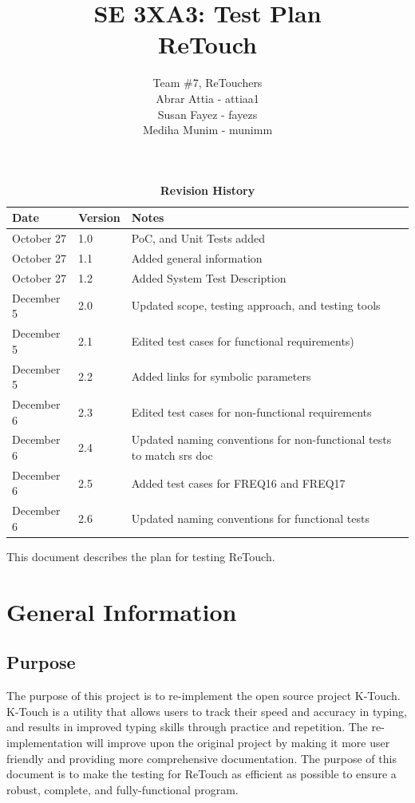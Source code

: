 \documentclass[12pt, titlepage]{article}
\title{SE 3XA3: Test Plan\\ReTouch}
\author{Team \#7, ReTouchers
		\\ Abrar Attia - attiaa1
		\\ Susan Fayez - fayezs
		\\ Mediha Munim - munimm
}
\begin{document}
\maketitle

\tableofcontents
\listoftables
\listoffigures

\begin{table}[htp]
\caption{\bf Revision History}
\begin{tabularx}{\textwidth}{p{3cm}p{2cm}X}
\toprule {\bf Date} & {\bf Version} & {\bf Notes}\\
\midrule
October 27 & 1.0 & PoC, and Unit Tests added\\
October 27 & 1.1 & Added general information\\
October 27 & 1.2 & Added System Test Description\\
December 5 & 2.0 & Updated scope, testing approach, and testing tools\\
December 5 & 2.1 & Edited test cases for functional  requirements)\\
December 5 & 2.2 & Added links for symbolic parameters\\
December 6 & 2.3 & Edited test cases for non-functional requirements\\
December 6 & 2.4 & Updated naming conventions for non-functional tests to match srs doc\\
December 6 & 2.5 & Added test cases for FREQ16 and FREQ17\\
December 6 & 2.6 & Updated naming conventions for functional tests\\

\bottomrule
\end{tabularx}
\end{table}
\newpage


This document describes the plan for testing ReTouch.

\section{General Information}

\subsection{Purpose}

	The purpose of this project is to re-implement the open source project K-Touch. K-Touch is a utility that allows users to track their speed and accuracy in typing, and results in improved typing skills through practice and repetition. The re-implementation will improve upon the original project by making it more user friendly and providing more comprehensive documentation. The purpose of this document is to make the testing for ReTouch as efficient as possible to ensure a robust, complete, and fully-functional program.
\end{document}

